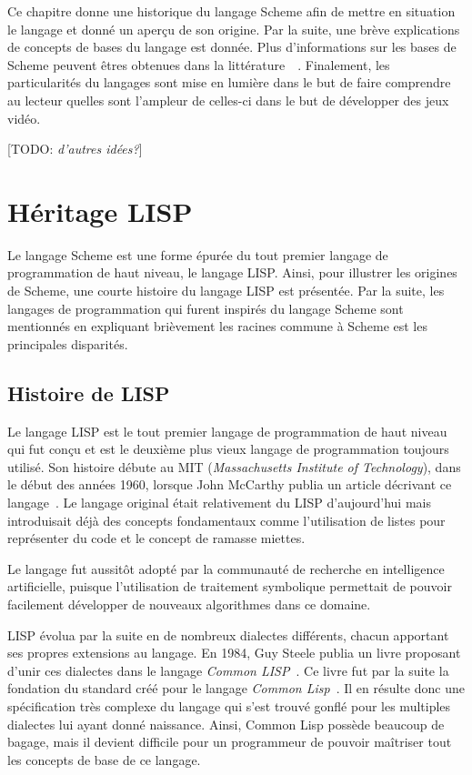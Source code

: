 \documentclass[12pt,oneside,letterpaper,francais]{book}
\newcommand{\todo}[1]{[TODO: {\it #1}]}
\begin{document}
Ce chapitre donne une historique du langage Scheme afin de mettre en
situation le langage et donné un aperçu de son origine. Par la suite,
une brève explications de concepts de bases du langage est
donnée. Plus d'informations sur les bases de Scheme peuvent êtres
obtenues dans la littérature~\cite{R5RS}~\cite{SICP}. Finalement, les
particularités du langages sont mise en lumière dans le but de faire
comprendre au lecteur quelles sont l'ampleur de celles-ci dans le but
de développer des jeux vidéo.

\todo{d'autres idées?}

\section{Héritage LISP}
\label{Scheme:hist}

Le langage Scheme est une forme épurée du tout premier langage de
programmation de haut niveau, le langage LISP. Ainsi, pour illustrer
les origines de Scheme, une courte histoire du langage LISP est
présentée. Par la suite, les langages de programmation qui furent
inspirés du langage Scheme sont mentionnés en expliquant brièvement
les racines commune à Scheme est les principales disparités.

\subsection{Histoire de LISP}
Le langage LISP est le tout premier langage de programmation de haut
niveau qui fut conçu et est le deuxième plus vieux langage de
programmation toujours utilisé. Son histoire débute au MIT
(\textit{Massachusetts Institute of Technology}), dans le début des
années 1960, lorsque John McCarthy publia un article décrivant ce
langage~\cite{LISP_ORIGINS}. Le langage original était relativement
du LISP d'aujourd'hui mais introduisait déjà des concepts fondamentaux
comme l'utilisation de listes pour représenter du code et le concept
de ramasse miettes.

Le langage fut aussitôt adopté par la communauté de recherche en
intelligence artificielle, puisque l'utilisation de traitement
symbolique permettait de pouvoir facilement développer de nouveaux
algorithmes dans ce domaine.

LISP évolua par la suite en de nombreux dialectes différents, chacun
apportant ses propres extensions au langage. En 1984, Guy Steele
publia un livre proposant d'unir ces dialectes dans le langage
\textit{Common LISP}~\cite{CLISP}. Ce livre fut par la suite la
fondation du standard créé pour le langage \textit{Common
  Lisp}~\cite{ANSI_CLISP}. Il en résulte donc une spécification très
complexe du langage qui s'est trouvé gonflé pour les multiples
dialectes lui ayant donné naissance. Ainsi, Common Lisp possède
beaucoup de bagage, mais il devient difficile pour un programmeur de
pouvoir maîtriser tout les concepts de base de ce langage.
\end{document}
